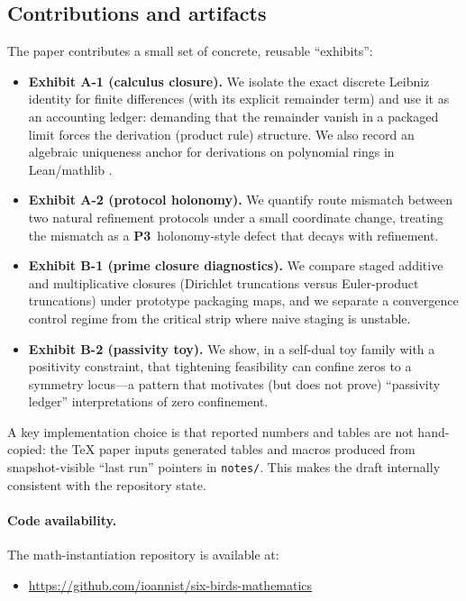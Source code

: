 \documentclass[apajournal,article,submit,moreauthors,pdftex]{Definitions/mdpi}
\newcommand{\Pthree}{\textbf{P3}}
\begin{document}
\subsection{Contributions and artifacts}
The paper contributes a small set of concrete, reusable ``exhibits'':

\begin{itemize}
  \item \textbf{Exhibit A-1 (calculus closure).} We isolate the exact discrete Leibniz identity for finite differences (with its explicit remainder term) and use it as an accounting ledger: demanding that the remainder vanish in a packaged limit forces the derivation (product rule) structure. We also record an algebraic uniqueness anchor for derivations on polynomial rings in Lean/mathlib \cite{moura2021lean4,mathlib2020lean}.
  \item \textbf{Exhibit A-2 (protocol holonomy).} We quantify route mismatch between two natural refinement protocols under a small coordinate change, treating the mismatch as a \Pthree\ holonomy-style defect that decays with refinement.
  \item \textbf{Exhibit B-1 (prime closure diagnostics).} We compare staged additive and multiplicative closures (Dirichlet truncations versus Euler-product truncations) under prototype packaging maps, and we separate a convergence control regime from the critical strip where naive staging is unstable.
  \item \textbf{Exhibit B-2 (passivity toy).} We show, in a self-dual toy family with a positivity constraint, that tightening feasibility can confine zeros to a symmetry locus---a pattern that motivates (but does not prove) ``passivity ledger'' interpretations of zero confinement.
\end{itemize}

A key implementation choice is that reported numbers and tables are not hand-copied: the TeX paper inputs generated tables and macros produced from snapshot-visible ``last run'' pointers in \texttt{notes/}.
This makes the draft internally consistent with the repository state.

\paragraph{Code availability.}
The math-instantiation repository is available at:
\begin{itemize}[noitemsep,topsep=2pt]
\item \url{https://github.com/ioannist/six-birds-mathematics}
\end{itemize}
\end{document}
